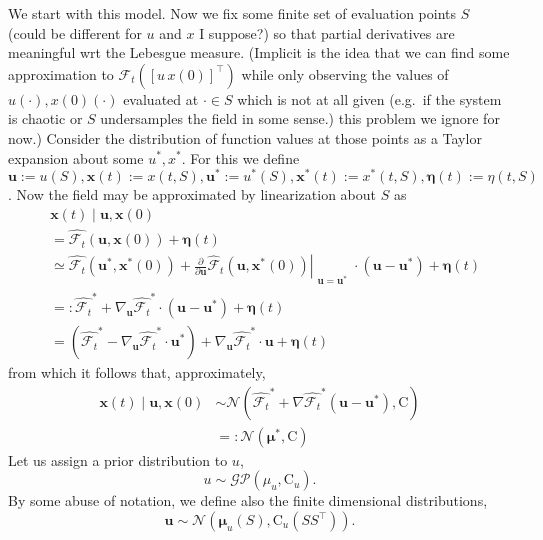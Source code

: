 \documentclass{article}
\newcommand{\vv}[1]{\boldsymbol{#1}}
\newcommand{\mm}[1]{\mathrm{#1}}
\newcommand{\dist}[1]{\mathcal{#1}}
\newcommand{\set}[1]{#1}
\newcommand{\gvn}{\mid}
\begin{document}
We start with this model.
Now we fix some finite set of evaluation points $\set{S}$ (could be different for $u$ and $x$ I suppose?) so that partial derivatives are meaningful wrt the Lebesgue measure.
(Implicit  is the idea that we can find some approximation to \(\mathcal{F}_{t}([u\,x(0)]^\top)\) while only observing the values of \(u(\cdot),x(0)(\cdot)\) evaluated at \(\cdot \in \set{S}\) which is not at all given (e.g.~if the system is chaotic or \(\set{S}\) undersamples the field in some sense.)
this problem we ignore for now.)
Consider the distribution of function values at those points as a Taylor expansion about some \(u^*,x^*\).
For this we define \(\vv{u}:=u(\set{S}),\vv{x}(t):=x(t, \set{S}),\vv{u}^*:=u^*(\set{S}),\vv{x}^*(t):=x^*(t, \set{S}),\vv{\eta}(t):=\eta(t,\set{S})\).
Now the field may be approximated by linearization about $\set{S}$ as
\begin{align}
&\vv{x}(t)\gvn \vv{u}, \vv{x}(0)\\
&=\widehat{\mathcal{F}_{t}}\left(\vv{u},\vv{x}(0)\right)+\vv{\eta}(t)\\
&\simeq\widehat{\mathcal{F}_{t}}\left(\vv{u}^*,\vv{x}^*(0)\right)
+\left.\frac{\partial}{\partial \vv{u}}
  \widehat{\mathcal{F}}_{t}\left(
    \vv{u},\vv{x}^*(0)
  \right)\right|_{\substack{\vv{u}=\vv{u}^*}} 
  \cdot (\vv{u}-\vv{u}^*)
  +\vv{\eta}(t)\\
&=:\widehat{\mathcal{F}_{t}}^*
+ \nabla_{\vv{u}} \widehat{\mathcal{F}_{t}}^*
  \cdot (\vv{u}-\vv{u}^*)
  +\vv{\eta}(t)\\ 
&=\left(\widehat{\mathcal{F}_{t}}^*
  -\nabla_{\vv{u}} \widehat{\mathcal{F}_{t}}^*\cdot \vv{u}^*\right)
  +\nabla_{\vv{u}} \widehat{\mathcal{F}_{t}}^*\cdot \vv{u}
  +\vv{\eta}(t)
\end{align}
from which it follows that, approximately,
\begin{align}
\vv{x}(t)\gvn \vv{u}, \vv{x}(0)
&\sim \dist{N}\left(\widehat{\mathcal{F}_{t}}^*
+ \nabla \widehat{\mathcal{F}_{t}}^*
  (\vv{u}-\vv{u}^*),
  \mm{C}\right)\\
&=: \dist{N}\left(\vv{\mu}^*, \mm{C}\right)\end{align}
Let us assign a prior distribution to \(u\),
\[u\sim \dist{GP}(\mu_u,\mm{C}_u).\]
By some abuse of notation, we define also the finite dimensional distributions,
\[\vv{u}\sim \dist{N}(\vv{\mu}_u(\set{S}),\vv{\mm{C}}_u(\set{S}\set{S}^\top)).\]
\end{document}
